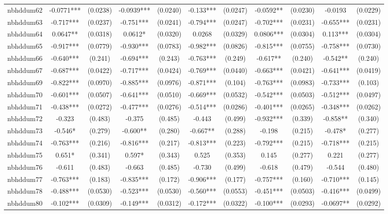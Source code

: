 \documentclass[]{article}
\begin{document}
\begin{tabular}{lcccccccccc}
nbhddum62 & -0.0771*** & (0.0238) & -0.0939*** & (0.0240) & -0.133*** & (0.0247) & -0.0592** & (0.0230) & -0.0193 & (0.0229) \\
nbhddum63 & -0.717*** & (0.0237) & -0.751*** & (0.0241) & -0.794*** & (0.0247) & -0.702*** & (0.0231) & -0.655*** & (0.0231) \\
nbhddum64 & 0.0647** & (0.0318) & 0.0612* & (0.0320) & 0.0268 & (0.0329) & 0.0806*** & (0.0304) & 0.113*** & (0.0304) \\
nbhddum65 & -0.917*** & (0.0779) & -0.930*** & (0.0783) & -0.982*** & (0.0826) & -0.815*** & (0.0755) & -0.758*** & (0.0730) \\
nbhddum66 & -0.640*** & (0.241) & -0.694*** & (0.243) & -0.763*** & (0.249) & -0.617** & (0.240) & -0.542** & (0.240) \\
nbhddum67 & -0.687*** & (0.0422) & -0.717*** & (0.0424) & -0.769*** & (0.0440) & -0.663*** & (0.0421) & -0.641*** & (0.0419) \\
nbhddum69 & -0.822*** & (0.0970) & -0.885*** & (0.0976) & -0.871*** & (0.104) & -0.763*** & (0.0983) & -0.733*** & (0.103) \\
nbhddum70 & -0.601*** & (0.0507) & -0.641*** & (0.0510) & -0.669*** & (0.0532) & -0.542*** & (0.0503) & -0.512*** & (0.0497) \\
nbhddum71 & -0.438*** & (0.0272) & -0.477*** & (0.0276) & -0.514*** & (0.0286) & -0.401*** & (0.0265) & -0.348*** & (0.0262) \\
nbhddum72 & -0.323 & (0.483) & -0.375 & (0.485) & -0.443 & (0.499) & -0.932*** & (0.339) & -0.858** & (0.340) \\
nbhddum73 & -0.546* & (0.279) & -0.600** & (0.280) & -0.667** & (0.288) & -0.198 & (0.215) & -0.478* & (0.277) \\
nbhddum74 & -0.763*** & (0.216) & -0.816*** & (0.217) & -0.813*** & (0.223) & -0.792*** & (0.215) & -0.718*** & (0.215) \\
nbhddum75 & 0.651* & (0.341) & 0.597* & (0.343) & 0.525 & (0.353) & 0.145 & (0.277) & 0.221 & (0.277) \\
nbhddum76 & -0.611 & (0.483) & -0.663 & (0.485) & -0.730 & (0.499) & -0.618 & (0.479) & -0.544 & (0.480) \\
nbhddum77 & -0.763*** & (0.183) & -0.835*** & (0.172) & -0.906*** & (0.177) & -0.757*** & (0.160) & -0.710*** & (0.145) \\
nbhddum78 & -0.488*** & (0.0530) & -0.523*** & (0.0530) & -0.560*** & (0.0553) & -0.451*** & (0.0503) & -0.416*** & (0.0499) \\
nbhddum80 & -0.102*** & (0.0309) & -0.149*** & (0.0312) & -0.172*** & (0.0322) & -0.100*** & (0.0293) & -0.0697** & (0.0292) \\

\end{tabular}
\end{document}
